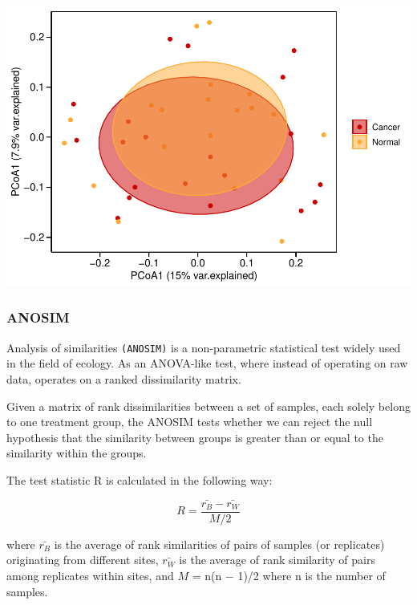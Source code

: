 \documentclass[
]{article}
\begin{document}
\includegraphics[width=0.7\linewidth,height=0.7\textheight]{workshop_files/figure-latex/unnamed-chunk-21-1}

\hypertarget{anosim}{%
\subsubsection{ANOSIM}\label{anosim}}

Analysis of similarities \texttt{(ANOSIM)} is a non-parametric
statistical test widely used in the field of ecology. As an ANOVA-like
test, where instead of operating on raw data, operates on a ranked
dissimilarity matrix.

Given a matrix of rank dissimilarities between a set of samples, each
solely belong to one treatment group, the ANOSIM tests whether we can
reject the null hypothesis that the similarity between groups is greater
than or equal to the similarity within the groups.

The test statistic R is calculated in the following way:

\[ R={\frac {\bar{r_{B}}-\bar{r_{W}}}{M/2}} \]

where \(\bar{r_{B}}\) is the average of rank similarities of pairs of
samples (or replicates) originating from different sites, \(\bar{r_W}\)
is the average of rank similarity of pairs among replicates within
sites, and \(M\) = n(n − 1)/2 where n is the number of samples.
\end{document}
